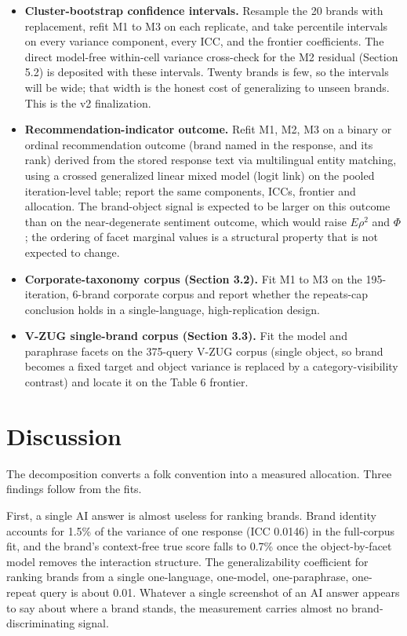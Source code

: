 \documentclass[pdflatex,sn-mathphys-num]{sn-jnl}
\begin{document}
\begin{itemize}
\item
  \textbf{Cluster-bootstrap confidence intervals.} Resample the 20 brands with replacement, refit M1 to M3 on each replicate, and take percentile intervals on every variance component, every ICC, and the frontier coefficients. The direct model-free within-cell variance cross-check for the M2 residual (Section 5.2) is deposited with these intervals. Twenty brands is few, so the intervals will be wide; that width is the honest cost of generalizing to unseen brands. This is the v2 finalization.
\item
  \textbf{Recommendation-indicator outcome.} Refit M1, M2, M3 on a binary or ordinal recommendation outcome (brand named in the response, and its rank) derived from the stored response text via multilingual entity matching, using a crossed generalized linear mixed model (logit link) on the pooled iteration-level table; report the same components, ICCs, frontier and allocation. The brand-object signal is expected to be larger on this outcome than on the near-degenerate sentiment outcome, which would raise \(E\rho^2\) and \(\Phi\); the ordering of facet marginal values is a structural property that is not expected to change.
\item
  \textbf{Corporate-taxonomy corpus (Section 3.2).} Fit M1 to M3 on the 195-iteration, 6-brand corporate corpus and report whether the repeats-cap conclusion holds in a single-language, high-replication design.
\item
  \textbf{V-ZUG single-brand corpus (Section 3.3).} Fit the model and paraphrase facets on the 375-query V-ZUG corpus (single object, so brand becomes a fixed target and object variance is replaced by a category-visibility contrast) and locate it on the Table 6 frontier.
\end{itemize}

\section{Discussion}\label{discussion}

The decomposition converts a folk convention into a measured allocation. Three findings follow from the fits.

First, a single AI answer is almost useless for ranking brands. Brand identity accounts for 1.5\% of the variance of one response (ICC 0.0146) in the full-corpus fit, and the brand's context-free true score falls to 0.7\% once the object-by-facet model removes the interaction structure. The generalizability coefficient for ranking brands from a single one-language, one-model, one-paraphrase, one-repeat query is about 0.01. Whatever a single screenshot of an AI answer appears to say about where a brand stands, the measurement carries almost no brand-discriminating signal.
\end{document}

